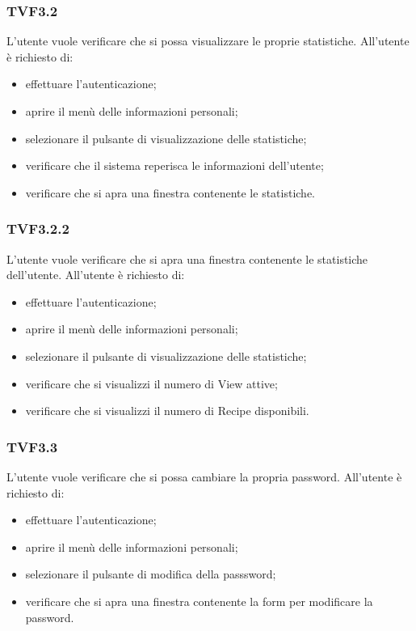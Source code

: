		\subsubsection{TVF3.2}
			L'utente vuole verificare che si possa visualizzare le proprie statistiche. All'utente è richiesto di:
			\begin{itemize}
				\item effettuare l'autenticazione;
				\item aprire il menù delle informazioni personali;
				\item selezionare il pulsante di visualizzazione delle statistiche;
				\item verificare che il sistema reperisca le informazioni dell'utente;
				\item verificare che si apra una finestra contenente le statistiche.
			\end{itemize}
			
		\subsubsection{TVF3.2.2}
			L'utente vuole verificare che si apra una finestra contenente le statistiche dell'utente. All'utente è richiesto di:
			\begin{itemize}
				\item effettuare l'autenticazione;
				\item aprire il menù delle informazioni personali;
				\item selezionare il pulsante di visualizzazione delle statistiche;
				\item verificare che si visualizzi il numero di View attive;
				\item verificare che si visualizzi il numero di Recipe disponibili.
			\end{itemize}
			
		\subsubsection{TVF3.3}
			L'utente vuole verificare che si possa cambiare la propria password. All'utente è richiesto di:
			\begin{itemize}
				\item effettuare l'autenticazione;
				\item aprire il menù delle informazioni personali;
				\item selezionare il pulsante di modifica della passsword;
				\item verificare che si apra una finestra contenente la form per modificare la password.
			\end{itemize}
		
